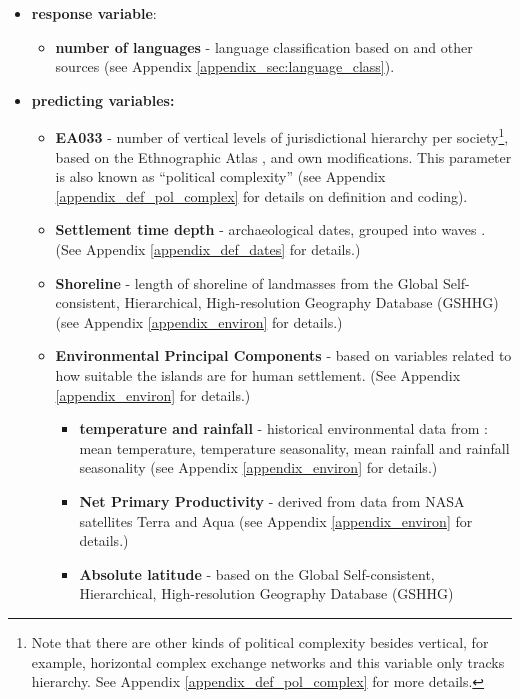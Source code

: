 \documentclass[unnumsec,webpdf,modern,medium]{oup-authoring-template}
\begin{document}
\begin{itemize}
\item \textbf{response variable}:
\begin{itemize}
\item \textbf{number of languages} - language classification based on \citet{glottolog40} and other sources (see Appendix \ref{appendix_sec:language_class}).
\end{itemize}
\item \textbf{predicting variables:}
\begin{itemize}

\item \textbf{EA033} - number of vertical levels of jurisdictional hierarchy per society\footnote{Note that there are other kinds of political complexity besides vertical, for example, horizontal complex exchange networks and this variable only tracks hierarchy. See Appendix \ref{appendix_def_pol_complex} for more details.}, based on the Ethnographic Atlas \citep{gray1998ethnographic, d_place_all}, \citet{sheehan2018coevolution} and own modifications. This parameter is also known as ``political complexity'' (see Appendix \ref{appendix_def_pol_complex} for details on definition and coding).

\item \textbf{Settlement time depth} - archaeological dates, grouped into waves \citep{intoh2007reconnaissance, intoh2008ongoing, rieth_cochrane_2018, levin_seikel_miles_2019, pol_outliers_stat_art, Napolitano_et_al_yap}. (See Appendix \ref{appendix_def_dates} for details.)

\item \textbf{Shoreline} - length of shoreline of landmasses from the Global Self-consistent, Hierarchical, High-resolution Geography Database (GSHHG) \citep{wessel1996global} (see Appendix \ref{appendix_environ} for details.)

\item \textbf{Environmental Principal Components} - based on variables related to how suitable the islands are for human settlement. (See Appendix \ref{appendix_environ} for details.)


\begin{itemize}
    \item \textbf{temperature and rainfall} - historical environmental data from \citet{ecoclimate}: mean temperature, temperature seasonality, mean rainfall and rainfall seasonality (see Appendix \ref{appendix_environ} for details.)
    \item \textbf{Net Primary Productivity} - derived from data from NASA satellites Terra and Aqua \citep{running2021modis_aqua, running2021modis_terra} (see Appendix \ref{appendix_environ} for details.)
    \item \textbf{Absolute latitude} - based on the Global Self-consistent, Hierarchical, High-resolution Geography Database (GSHHG) 
\end{itemize}


\end{itemize}
\end{itemize}
\end{document}
